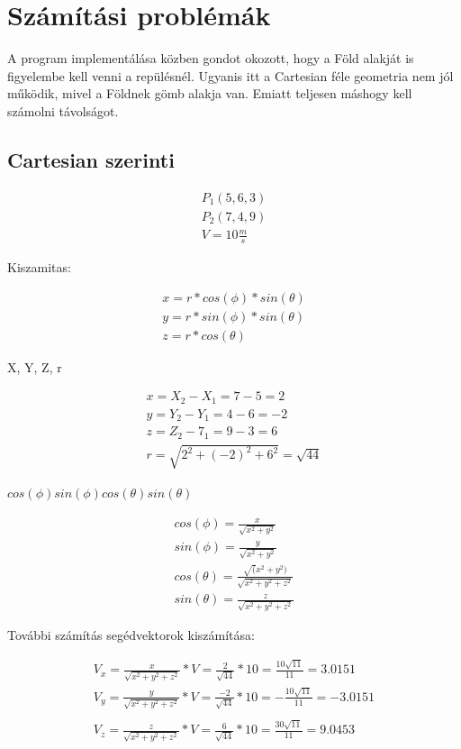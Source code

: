 \section{Számítási problémák}
A program implementálása közben gondot okozott, hogy a Föld alakját is figyelembe kell venni a repülésnél.
Ugyanis itt a Cartesian féle geometria nem jól működik, mivel a Földnek gömb alakja van.
Emiatt teljesen máshogy kell számolni távolságot.
\subsection{Cartesian szerinti}
\begin{gather}
    P_1(5,6,3) \\
    P_2(7,4,9) \\
    V = 10 \frac{m}{s}
\end{gather}


Kiszamitas:

\begin{gather}
    x = r * cos(\phi) * sin(\theta) \\
    y = r * sin(\phi) * sin(\theta) \\
    z = r * cos(\theta)
\end{gather}


X, Y, Z, r

\begin{gather}
    x = X_2 - X_1 = 7 - 5 = 2 \\
    y = Y_2 - Y_1 = 4 - 6 = -2 \\
    z = Z_2 - 7_1 = 9 - 3 = 6 \\
    r = \sqrt{2^2 + (-2)^2 + 6^2} = \sqrt{44}
\end{gather}

$
cos(\phi) sin(\phi) cos(\theta) sin(\theta)
$

\begin{gather}
    cos(\phi) = \frac{x}{\sqrt{x^2 + y^2}} \\
    sin(\phi) = \frac{y}{\sqrt{x^2 + y^2}} \\
    cos(\theta) = \frac{\sqrt(x^2 + y^2)}{\sqrt{x^2 + y^2 + z^2}} \\
    sin(\theta) = \frac{z}{\sqrt{x^2 + y^2 + z^2}}
\end{gather}

\newpage

További számítás segédvektorok kiszámítása:

\begin{gather}
    V_x = \frac{x}{\sqrt{x^2 + y^2 + z^2}} *V = \frac{2}{\sqrt{44}} * 10 = \frac{10\sqrt{11}}{11} = 3.0151\\
    V_y = \frac{y}{\sqrt{x^2 + y^2 + z^2}} *V = \frac{-2}{\sqrt{44}} * 10 = -\frac{10\sqrt{11}}{11} = -3.0151\\\\
    V_z = \frac{z}{\sqrt{x^2 + y^2 + z^2}} *V = \frac{6}{\sqrt{44}} * 10 = \frac{30\sqrt{11}}{11} = 9.0453\\
\end{gather}

